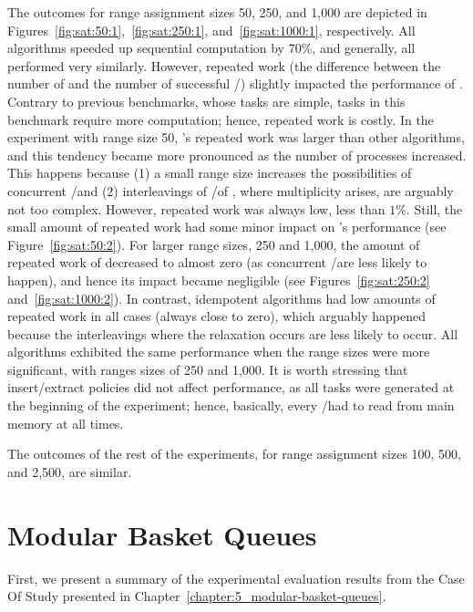 The outcomes for range assignment sizes 50, 250, and 1,000 are depicted in Figures~\ref{fig:sat:50:1},~\ref{fig:sat:250:1}, and~\ref{fig:sat:1000:1}, respectively. All algorithms speeded up sequential computation by 70\%, and generally, all performed very similarly. However, repeated work (the difference between the number of \Puts and the number of successful \Takes/\Steals) slightly impacted the performance of \NCWSM. Contrary to previous benchmarks, whose tasks are simple, tasks in this benchmark require more computation; hence, repeated work is costly. In the experiment with range size 50, \NCWSM's repeated work was larger than other algorithms, and this tendency became more pronounced as the number of processes increased. This happens because (1) a small range size increases the possibilities of concurrent \Puts/\Takes and (2) interleavings of \Puts/\Takes of \NCWSM, where multiplicity arises, are arguably not too complex. However, repeated work was always low, less than $1\%$. Still, the small amount of repeated work had some minor impact on \NCWSM's performance (see Figure~\ref{fig:sat:50:2}). For larger range sizes, 250 and 1,000, the amount of repeated work of \NCWSM decreased to almost zero (as concurrent \Puts/\Takes are less likely to happen), and hence its impact became negligible (see Figures~\ref{fig:sat:250:2} and~\ref{fig:sat:1000:2}). In contrast, idempotent algorithms had low amounts of repeated work in all cases (always close to zero), which arguably happened because the interleavings where the relaxation occurs are less likely to occur. All algorithms exhibited the same performance when the range sizes were more significant, with ranges sizes of 250 and 1,000. It is worth stressing that insert/extract policies did not affect performance, as all tasks were generated at the beginning of the experiment; hence, basically, every \Take/\Steal had to read from main memory at all times.

The outcomes of the rest of the experiments, for range assignment sizes 100, 500, and 2,500, are similar.%


\section{\label{sec:results-modular-basket-queue}Modular Basket Queues}

First, we present a summary of the experimental evaluation results from the Case Of Study presented in Chapter~\ref{chapter:5_modular-basket-queues}.

